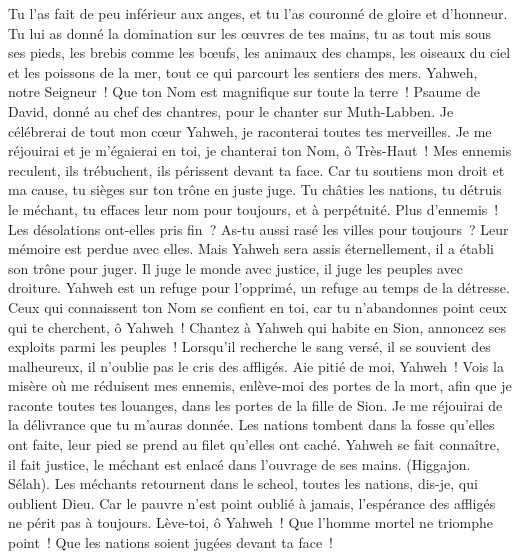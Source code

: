 \begin{multicols}{2}
Tu l'as fait de peu inférieur aux anges, et tu l'as couronné de gloire et d'honneur.
Tu lui as donné la domination sur les œuvres de tes mains, tu as tout mis sous ses pieds,
les brebis comme les bœufs, les animaux des champs,
les oiseaux du ciel et les poissons de la mer, tout ce qui parcourt les sentiers des mers.
Yahweh, notre Seigneur~! Que ton Nom est magnifique sur toute la terre~!
\VerseOne{}Psaume de David, donné au chef des chantres, pour le chanter sur Muth-Labben.
Je célébrerai de tout mon cœur Yahweh, je raconterai toutes tes merveilles.
Je me réjouirai et je m'égaierai en toi, je chanterai ton Nom, ô Très-Haut~!
Mes ennemis reculent, ils trébuchent, ils périssent devant ta face.
Car tu soutiens mon droit et ma cause, tu sièges sur ton trône en juste juge.
Tu châties les nations, tu détruis le méchant, tu effaces leur nom pour toujours, et à perpétuité.
Plus d'ennemis~! Les désolations ont-elles pris fin~? As-tu aussi rasé les villes pour toujours~? Leur mémoire est perdue avec elles.
Mais Yahweh sera assis éternellement, il a établi son trône pour juger.
Il juge le monde avec justice, il juge les peuples avec droiture.
Yahweh est un refuge pour l'opprimé, un refuge au temps de la détresse.
Ceux qui connaissent ton Nom se confient en toi, car tu n'abandonnes point ceux qui te cherchent, ô Yahweh~!
Chantez à Yahweh qui habite en Sion, annoncez ses exploits parmi les peuples~!
Lorsqu'il recherche le sang versé, il se souvient des malheureux, il n'oublie pas le cris des affligés.
Aie pitié de moi, Yahweh~! Vois la misère où me réduisent mes ennemis, enlève-moi des portes de la mort,
afin que je raconte toutes tes louanges, dans les portes de la fille de Sion. Je me réjouirai de la délivrance que tu m'auras donnée.
Les nations tombent dans la fosse qu'elles ont faite, leur pied se prend au filet qu'elles ont caché.
Yahweh se fait connaître, il fait justice, le méchant est enlacé dans l'ouvrage de ses mains. (Higgajon. Sélah).
Les méchants retournent dans le scheol, toutes les nations, dis-je, qui oublient Dieu.
Car le pauvre n'est point oublié à jamais, l'espérance des affligés ne périt pas à toujours.
Lève-toi, ô Yahweh~! Que l'homme mortel ne triomphe point~! Que les nations soient jugées devant ta face~!

\end{multicols}
